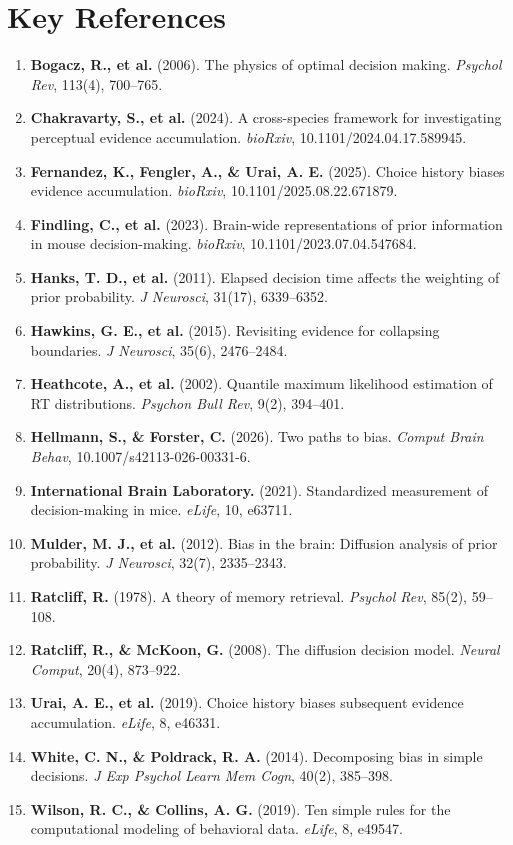 \documentclass[10pt,a4paper]{article}
\begin{document}
\section*{Key References}
\small
\begin{enumerate}
    \item \textbf{Bogacz, R., et al.} (2006). The physics of optimal decision making. \textit{Psychol Rev}, 113(4), 700--765.
    \item \textbf{Chakravarty, S., et al.} (2024). A cross-species framework for investigating perceptual evidence accumulation. \textit{bioRxiv}, 10.1101/2024.04.17.589945.
    \item \textbf{Fernandez, K., Fengler, A., \& Urai, A. E.} (2025). Choice history biases evidence accumulation. \textit{bioRxiv}, 10.1101/2025.08.22.671879.
    \item \textbf{Findling, C., et al.} (2023). Brain-wide representations of prior information in mouse decision-making. \textit{bioRxiv}, 10.1101/2023.07.04.547684.
    \item \textbf{Hanks, T. D., et al.} (2011). Elapsed decision time affects the weighting of prior probability. \textit{J Neurosci}, 31(17), 6339--6352.
    \item \textbf{Hawkins, G. E., et al.} (2015). Revisiting evidence for collapsing boundaries. \textit{J Neurosci}, 35(6), 2476--2484.
    \item \textbf{Heathcote, A., et al.} (2002). Quantile maximum likelihood estimation of RT distributions. \textit{Psychon Bull Rev}, 9(2), 394--401.
    \item \textbf{Hellmann, S., \& Forster, C.} (2026). Two paths to bias. \textit{Comput Brain Behav}, 10.1007/s42113-026-00331-6.
    \item \textbf{International Brain Laboratory.} (2021). Standardized measurement of decision-making in mice. \textit{eLife}, 10, e63711.
    \item \textbf{Mulder, M. J., et al.} (2012). Bias in the brain: Diffusion analysis of prior probability. \textit{J Neurosci}, 32(7), 2335--2343.
    \item \textbf{Ratcliff, R.} (1978). A theory of memory retrieval. \textit{Psychol Rev}, 85(2), 59--108.
    \item \textbf{Ratcliff, R., \& McKoon, G.} (2008). The diffusion decision model. \textit{Neural Comput}, 20(4), 873--922.
    \item \textbf{Urai, A. E., et al.} (2019). Choice history biases subsequent evidence accumulation. \textit{eLife}, 8, e46331.
    \item \textbf{White, C. N., \& Poldrack, R. A.} (2014). Decomposing bias in simple decisions. \textit{J Exp Psychol Learn Mem Cogn}, 40(2), 385--398.
    \item \textbf{Wilson, R. C., \& Collins, A. G.} (2019). Ten simple rules for the computational modeling of behavioral data. \textit{eLife}, 8, e49547.
\end{enumerate}
\end{document}
